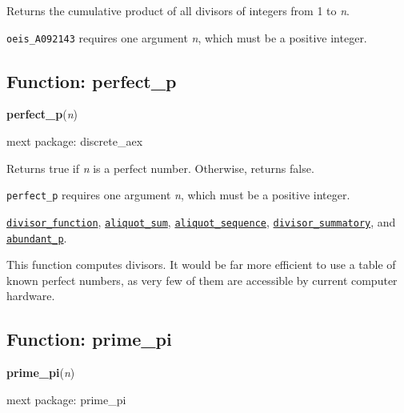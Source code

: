 \documentclass[]{article}
\begin{document}
\vspace{5 pt}
Returns the cumulative product of all divisors of integers from 1 to {\it n}. 

\vspace{5 pt}

   {\tt oeis\_A092143} requires one argument {\it n}, which must be a positive integer.


\vspace{5 pt}


\subsection{Function: perfect\_p\label{sec:perfect_p}}
\hypertarget{perfect_p}{}
{\bf perfect\_p}({\it n})


\noindent mext package: discrete\_aex



\vspace{5 pt}
Returns true if {\it n} is a perfect number. Otherwise, returns false. 

\vspace{5 pt}

   {\tt perfect\_p} requires one argument {\it n}, which must be a positive integer.


\vspace{5 pt}


  \hyperlink{divisor_function}{{\tt divisor\_function}}, \hyperlink{aliquot_sum}{{\tt aliquot\_sum}}, \hyperlink{aliquot_sequence}{{\tt aliquot\_sequence}}, \hyperlink{divisor_summatory}{{\tt divisor\_summatory}}, and \hyperlink{abundant_p}{{\tt abundant\_p}}.

\vspace{5 pt}


This function computes divisors. It would be far more efficient to use a table of known perfect numbers, as very few of them are accessible by current computer hardware. 

\vspace{5 pt}


\subsection{Function: prime\_pi\label{sec:prime_pi}}
\hypertarget{prime_pi}{}
{\bf prime\_pi}({\it n})


\noindent mext package: prime\_pi
\end{document}
